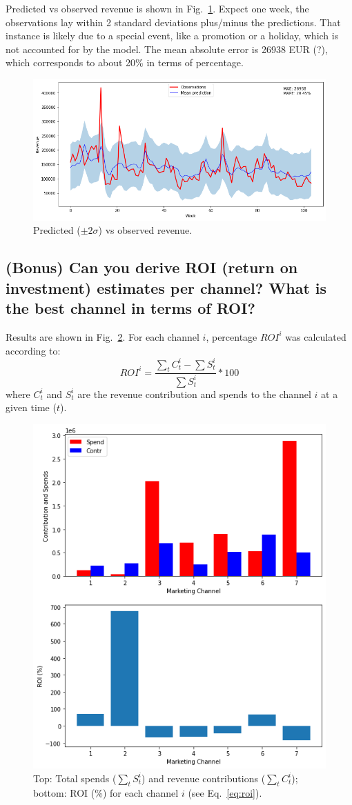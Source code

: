 \documentclass[a4paper,10pt]{scrartcl}
\begin{document}
Predicted vs observed revenue is shown in Fig.~\ref{f:preds_vs_obs}. Expect one week, the observations lay within 2 standard deviations plus/minus the predictions. That instance is likely due to a special event, like a promotion or a holiday, which is not accounted for by the model. The mean absolute error is 26938 EUR (?), which corresponds to about 20\% in terms of percentage. 

\begin{figure}[!h]
  \centering
  \includegraphics[trim=0mm 0mm 0mm 0mm, clip, width=.8\textwidth]{preds_vs_obs.png}
  \caption{Predicted ($\pm 2\sigma$) vs observed revenue.}\label{f:preds_vs_obs}
\end{figure}


\FloatBarrier

\subsection {(Bonus) Can you derive ROI (return on investment) estimates per channel? What is the best channel in terms of ROI?}
Results are shown in Fig.~\ref{f:CS_ROI}. For each channel $i$, percentage $ROI^i$ was calculated according to:
\begin{equation}\label{eq:roi}
 ROI^i = \frac{\sum_t C_t^i - \sum S_t^i}{\sum S_t^i} * 100
\end{equation}
where $C_t^i$ and $S_t^i$ are the revenue contribution and spends to the channel $i$ at a given time ($t$).  


\begin{figure}[!h]
  \centering
  \includegraphics[trim=0mm 0mm 0mm 0mm, clip, width=.5\textwidth]{contributions_roi.png}
  \caption{Top: Total spends ($\sum_t S_t^i$) and revenue contributions ($\sum_t C_t^i$); bottom: ROI (\%) for each channel $i$ (see Eq.~\ref{eq:roi}).}\label{f:CS_ROI}
\end{figure}
\end{document}
